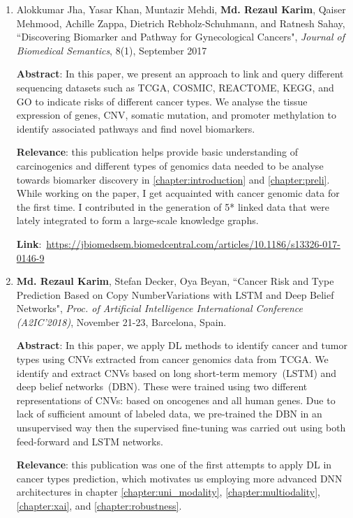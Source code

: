 \begin{enumerate}
	\item {Alokkumar Jha, Yasar Khan, Muntazir Mehdi, \textbf{Md. Rezaul Karim}, Qaiser Mehmood, Achille Zappa, Dietrich Rebholz-Schuhmann, and Ratnesh Sahay, ``Discovering Biomarker and Pathway for Gynecological Cancers", \emph{Journal of Biomedical Semantics}, 8(1), September 2017} 
	
	\textbf{Abstract}: In this paper, we present an approach to link and query different sequencing datasets such as TCGA, COSMIC, REACTOME, KEGG, and GO to indicate risks of different cancer types. We analyse the tissue expression of genes, CNV, somatic mutation, and promoter methylation to identify associated pathways and find novel biomarkers. 
	
	\textbf{Relevance}: this publication helps provide basic understanding of carcinogenics and different types of genomics data needed to be analyse towards biomarker discovery in \cref{chapter:introduction} and \cref{chapter:preli}. While working on the paper, I get acquainted with cancer genomic data for the first time. I contributed in the generation of 5* linked data that were lately integrated to form a large-scale knowledge graphs. 
	
	\textbf{Link}:~\url{https://jbiomedsem.biomedcentral.com/articles/10.1186/s13326-017-0146-9}
	
	\item \textbf{Md. Rezaul Karim}, Stefan Decker, Oya Beyan, ``Cancer Risk and Type Prediction Based on Copy NumberVariations with LSTM and Deep Belief Networks", \emph{Proc. of Artificial Intelligence International Conference (A2IC'2018)}, November 21-23, Barcelona, Spain. 
	
	\textbf{Abstract}: In this paper, we apply DL methods to identify cancer and tumor types using CNVs extracted from cancer genomics data from TCGA. We identify and extract CNVs based on long short-term memory~(LSTM) and deep belief networks~(DBN). These were trained using two different representations of CNVs: based on oncogenes and all human genes. Due to lack of sufficient amount of labeled data, we pre-trained the DBN in an unsupervised way then the supervised fine-tuning was carried out using both feed-forward and LSTM networks. 
	
	\textbf{Relevance}: this publication was one of the first attempts to apply DL in cancer types prediction, which motivates us employing more advanced DNN architectures in chapter \ref{chapter:uni_modality}, \ref{chapter:multiodality}, \ref{chapter:xai}, and \ref{chapter:robustness}.
	

\end{enumerate}
